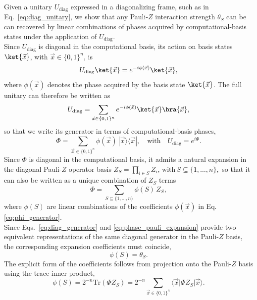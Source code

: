 Given a unitary $U_{\mathrm{diag}}$ expressed in a diagonalizing frame, such as in Eq.~\eqref{eq:diag_unitary}, we show that any Pauli-$Z$ interaction strength $\theta_S$ can be can recovered by linear combinations of phases acquired by computational-basis states under the application of $U_{\mathrm{diag}}$. \\

\noindent
Since $U_{\mathrm{diag}}$ is diagonal in the computational basis, its action on basis states
$\ket{\vec{x}}$, with $\vec{x}\in\{0,1\}^n$, is
\begin{equation}
U_{\mathrm{diag}}\ket{\vec{x}}
=
e^{-i\phi(\vec{x})}\ket{\vec{x}},
\end{equation}
where $\phi(\vec{x})$ denotes the phase acquired by the basis state $\ket{\vec{x}}$. The full unitary can therefore be written as
\begin{equation}
U_{\mathrm{diag}}
=
\sum_{\vec{x}\in\{0,1\}^n}
e^{-i\phi(\vec{x})}
\ket{\vec{x}}\bra{\vec{x}},
\label{eq:diag_unitary_comp_phases}
\end{equation}
so that we write its generator in terms of computational-basis phases, 
\begin{equation}
\Phi
=
\sum_{\vec{x}\in\{0,1\}^n} \phi(\vec{x})\,|\vec{x}\rangle\langle\vec{x}|,
\quad \text{with} \quad
U_{\mathrm{diag}} = e^{i\Phi}.
\label{eq:phi_generator}
\end{equation}
Since $\Phi$ is diagonal in the computational basis, it admits a natural expansion in the diagonal Pauli-$Z$ operator basis
\(Z_S = \prod_{i\in S} Z_i,\,\text{with}\, S \subseteq \{1,\dots,n\}, \)
so that it can also be written as a unique combination of $Z_S$ terms
\begin{equation}
\Phi
=
\sum_{S\subseteq\{1,\dots,n\}}
\phi(S)\, Z_S ,
\label{eq:phase_pauli_expansion}
\end{equation}
where $\phi(S)$ are linear combinations of the coefficients $\phi(\vec{x})$ in Eq.\eqref{eq:phi_generator}. \\
Since Eqs.~\eqref{eq:diag_generator} and \eqref{eq:phase_pauli_expansion} provide two equivalent representations of the same diagonal generator in the Pauli-$Z$ basis, the corresponding expansion coefficients must coincide,
\begin{equation}
\phi(S)=\theta_S.
\label{eq:phi_theta_equivalence}
\end{equation}
The explicit form of the coefficients follows from projection onto the Pauli-$Z$ basis using the trace inner product,
\begin{equation}
\phi(S)
=
2^{-n}\mathrm{Tr}(\Phi Z_S)
=
2^{-n}
\sum_{\vec{x}\in\{0,1\}^n}
\langle\vec{x}|\Phi Z_S|\vec{x}\rangle.
\label{eq:phase_invariant}
\end{equation}
